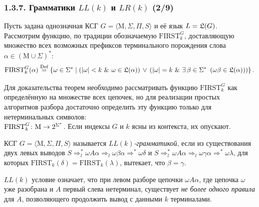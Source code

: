 \documentclass[mathserif,12pt,aspectratio=169]{beamer}
\def\emразделенной{\em разделенной}
\renewcommand{\index}[1]{}
\def\em#1{\it\color{blue}#1}
\def\odmkey#1#2{{\it\color{red} #1}\index{#2}}
\def\Set#1#2{\left\{ #1 \mid #2 \right\}}
\def\Def{\stackrel{\text{Def}}{=}}
\def\E#1#2{\exists\,#1\ \left(#2\right)}
\def\And{\operatorname{\,\&\,}}
\def\Or{\,\vee\,}
\def\Map#1#2#3{{#1}\colon{#2}\nolinebreak\to\nolinebreak{#3}}
\begin{document}
\begin{frame}
\frametitle{1.3.7. Грамматики $LL(k)$ и $LR(k)$ (2/9)}
Пусть задана однозначная КСГ $G=\langle \mathrm{M}, \Sigma, \Pi, S \rangle$ и её язык 
$L = \frak{L}(G)$. Рассмотрим функцию, по традиции обозначаемую
$\mathrm{FIRST}^G_k$, доставляющую множество всех 
возможных префиксов терминального порождения слова $\alpha\in(\mathrm{M}\cup\Sigma)^*$:      
$$
    \mathrm{FIRST}_k^G(\alpha) \Def
    \Set{\omega\in\Sigma^*}{(|\omega| < k \And \omega\in\frak{L}(\alpha))
    \Or (|\omega| = k \And \E{\beta\in\Sigma^*}{\omega\beta\in\frak{L}(\alpha) })}.
$$
\begin{remark}
Для доказательства теорем необходимо рассматривать 
функцию $\mathrm{FIRST}^G_k$ как определённую на множестве всех
цепочек, но для реализации простых алгоритмов разбора 
достаточно определить эту функцию только для нетерминальных символов:\\
$\Map{\mathrm{FIRST}^G_k}{\mathrm{M}}{2^{\Sigma^*}}$. 
Если индексы $G$ и $k$ ясны из контекста, их опускают.   
\end{remark}

\smallskip
КСГ $G=\langle \mathrm{M}, \Sigma, \Pi, S \rangle$ 
называется \odmkey{$LL(k)$-грамматикой}{Грамматика!$LL(k)$},
 если из существования двух левых выводов
$ S \Rightarrow_l^* \omega A\alpha \Rightarrow_l \omega\beta\alpha \Rightarrow^* \omega
\delta $ и
$ S \Rightarrow_l^* \omega A\alpha \Rightarrow_l \omega\gamma\alpha \Rightarrow^* \omega\lambda $,
для которых \( \mathrm{FIRST}_k(\delta) = \mathrm{FIRST}_k(\lambda) \), вытекает, 
что \( \beta = \gamma \).

\begin{remark} $LL(k)$ условие означает, что при левом разборе
цепочки \( \omega A\alpha \), где цепочка $\omega$ уже разобрана и $A$ первый слева нетерминал, существует {\em не более одного правила} для \( A \), позволяющего продолжить вывод с данными \( k \) терминалами.
\end{remark}
\end{frame}
\end{document}

